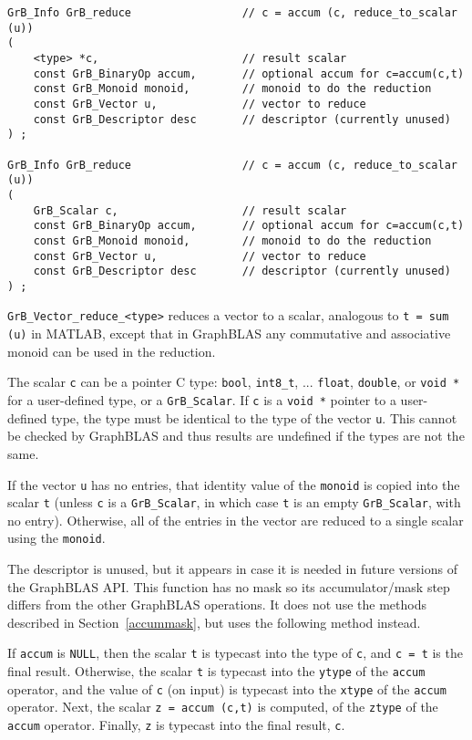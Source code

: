 \documentclass[12pt]{article}
\begin{document}
{\begin{mdframed}[userdefinedwidth=6in]
{\footnotesize
\begin{verbatim}
GrB_Info GrB_reduce                 // c = accum (c, reduce_to_scalar (u))
(
    <type> *c,                      // result scalar
    const GrB_BinaryOp accum,       // optional accum for c=accum(c,t)
    const GrB_Monoid monoid,        // monoid to do the reduction
    const GrB_Vector u,             // vector to reduce
    const GrB_Descriptor desc       // descriptor (currently unused)
) ;

GrB_Info GrB_reduce                 // c = accum (c, reduce_to_scalar (u))
(
    GrB_Scalar c,                   // result scalar
    const GrB_BinaryOp accum,       // optional accum for c=accum(c,t)
    const GrB_Monoid monoid,        // monoid to do the reduction
    const GrB_Vector u,             // vector to reduce
    const GrB_Descriptor desc       // descriptor (currently unused)
) ;
\end{verbatim} } \end{mdframed}

\verb'GrB_Vector_reduce_<type>'
reduces a vector to a scalar, analogous to \verb't = sum (u)' in MATLAB,
except that in GraphBLAS any commutative and associative monoid can be used
in the reduction.

The scalar \verb'c' can be a pointer C type: \verb'bool', \verb'int8_t', ...
\verb'float', \verb'double', or \verb'void *' for a user-defined type,
or a \verb'GrB_Scalar'.
If \verb'c' is a \verb'void *' pointer to a user-defined type,
the type must be identical to the type of the vector \verb'u'.
This cannot be checked by GraphBLAS and thus results are undefined if the
types are not the same.

If the vector \verb'u' has no entries, that identity value of the \verb'monoid'
is copied into the scalar \verb't' (unless \verb'c' is a \verb'GrB_Scalar',
in which case \verb't' is an empty \verb'GrB_Scalar', with no entry).
Otherwise, all of the entries in the
vector are reduced to a single scalar using the \verb'monoid'.

The descriptor is unused, but it appears in case it is needed in future
versions of the GraphBLAS API.
This function has no mask so its accumulator/mask step differs from the other
GraphBLAS operations.  It does not use the methods described in
Section~\ref{accummask}, but uses the following method instead.

If \verb'accum' is \verb'NULL', then the scalar \verb't' is typecast into the
type of \verb'c', and \verb'c = t' is the final result.  Otherwise, the scalar
\verb't' is typecast into the \verb'ytype' of the \verb'accum' operator, and
the value of \verb'c' (on input) is typecast into the \verb'xtype' of the
\verb'accum' operator.  Next, the scalar \verb'z = accum (c,t)' is computed, of
the \verb'ztype' of the \verb'accum' operator.  Finally, \verb'z' is typecast
into the final result, \verb'c'.

}
\end{document}
